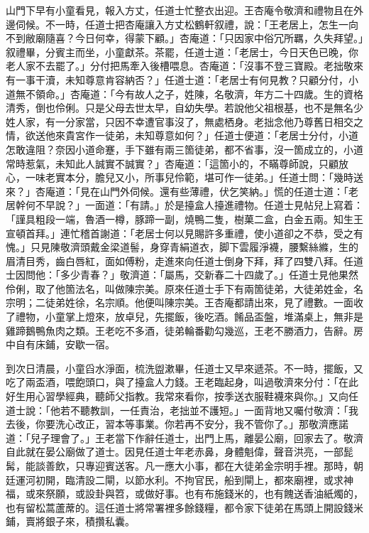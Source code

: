 山門下早有小童看見，報入方丈，任道士忙整衣出迎。王杏庵令敬濟和禮物且在外邊伺候。不一時，任道士把杏庵讓入方丈松鶴軒叙禮，說：「王老居上，怎生一向不到敝廟隨喜？今日何幸，得蒙下顧。」杏庵道：「只因家中俗冗所羈，久失拜望。」叙禮畢，分賓主而坐，小童獻茶。茶罷，任道士道：「老居士，今日天色已晚，你老人家不去罷了。」分付把馬牽入後槽喂息。杏庵道：「沒事不登三寶殿。老拙敬來有一事干瀆，未知尊意肯容納否？」任道士道：「老居士有何見教？只顧分付，小道無不領命。」杏庵道：「今有故人之子，姓陳，名敬濟，年方二十四歲。生的資格清秀，倒也伶俐。只是父母去世太早，自幼失學。若說他父祖根基，也不是無名少姓人家，有一分家當，只因不幸遭官事沒了，無處栖身。老拙念他乃尊舊日相交之情，欲送他來貴宮作一徒弟，未知尊意如何？」任道士便道：「老居士分付，小道怎敢違阻？奈因小道命蹇，手下雖有兩三箇徒弟，都不省事，沒一箇成立的，小道常時惹氣，未知此人誠實不誠實？」杏庵道：「這箇小的，不瞞尊師說，只顧放心，一味老實本分，膽兒又小，{}所事兒伶範，堪可作一徒弟。」{}任道士問：「幾時送來？」杏庵道：「見在山門外伺候。還有些薄禮，伏乞笑納。」慌的任道士道：「老居幹何不早說？」一面道：「有請。」於是擡盒人擡進禮物。任道士見帖兒上寫着：「謹具粗段一端，魯酒一樽，豚蹄一副，燒鴨二隻，樹菓二盒，白金五兩。知生王宣頓首拜。」連忙稽首謝道：「老居士何以見賜許多重禮，使小道卻之不恭，受之有愧。」只見陳敬濟頭戴金梁道髻，身穿青絹道衣，脚下雲履淨襪，腰繫絲縧，生的眉清目秀，齒白唇紅，面如傅粉，走進來向任道士倒身下拜，拜了四雙八拜。任道士因問他：「多少青春？」敬濟道：「屬馬，交新春二十四歲了。」任道士見他果然伶俐，取了他箇法名，叫做陳宗美。原來任道士手下有兩箇徒弟，大徒弟姓金，名宗明；二徒弟姓徐，名宗順。他便叫陳宗美。王杏庵都請出來，見了禮數。一面收了禮物，小童掌上燈來，放卓兒，先擺飯，後吃酒。餚品盃盤，堆滿桌上，無非是雞蹄鵝鴨魚肉之類。王老吃不多酒，徒弟輪番勸勾幾巡，王老不勝酒力，告辭。房中自有床鋪，安歇一宿。

到次日清晨，小童舀水淨面，梳洗盥漱畢，任道士又早來遞茶。不一時，擺飯，又吃了兩盃酒，喂飽頭口，與了擡盒人力錢。王老臨起身，叫過敬濟來分付：「在此好生用心習學經典，聽師父指教。我常來看你，按季送衣服鞋襪來與你。」又向任道士說：「他若不聽教訓，一任責治，老拙並不護短。」一面背地又囑付敬濟：「我去後，你要洗心改正，習本等事業。你若再不安分，我不管你了。」{}那敬濟應諾道：「兒子理會了。」王老當下作辭任道士，出門上馬，離晏公廟，回家去了。敬濟自此就在晏公廟做了道士。因見任道士年老赤鼻，身體魁偉，聲音洪亮，一部髭髯，能談善飲，只專迎賓送客。凡一應大小事，都在大徒弟金宗明手裡。那時，朝廷運河初開，臨清設二閘，以節水利。不拘官民，船到閘上，都來廟裡，或求神福，或來祭願，或設卦與笤，或做好事。也有布施錢米的，也有餽送香油紙燭的，也有留松蒿蘆蓆的。這任道士將常署裡多餘錢糧，都令家下徒弟在馬頭上開設錢米鋪，賣將銀子來，積攢私囊。

